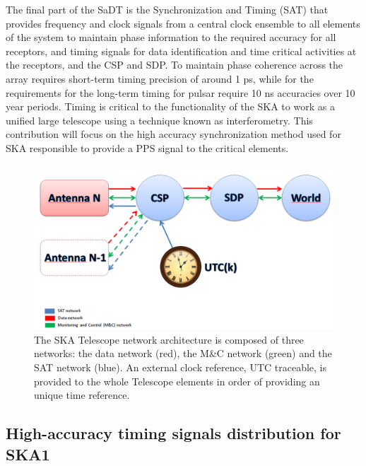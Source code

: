 The final part of the SaDT is the Synchronization and Timing (SAT) that provides frequency and clock signals from a central clock ensemble to all elements of the system to maintain phase information to the required accuracy for all receptors, and timing signals for data identification and time critical activities at the receptors, and the CSP and SDP. To maintain phase coherence across the array requires short-term timing precision of around 1 ps, while for the requirements for the long-term timing for pulsar require 10 ns accuracies over 10 year periods. Timing is critical to the functionality of the SKA to work as a unified large telescope using a technique known as interferometry. This contribution will focus on the high accuracy synchronization method used for SKA responsible to provide a PPS signal to the critical elements. 

\begin{figure}[H]
	\centering
	\includegraphics[scale=0.4]{img/ska_network_arch}
	\caption{The SKA Telescope network architecture is composed of three networks: the data network (red), the M\&C network (green) and the SAT network (blue). An external clock reference, UTC traceable, is provided to the whole Telescope elements in order of providing an unique time reference.}
	\label{fig:ska_net_arch1}
\end{figure}

\subsection{High-accuracy timing signals distribution for SKA1} \label{subsec:ska-distribution}

